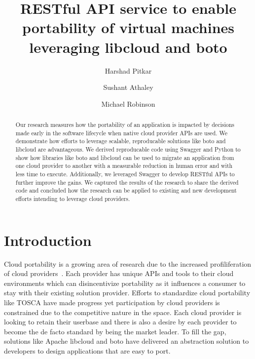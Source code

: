 % 
\title{RESTful API service to enable portability of virtual machines leveraging
libcloud and boto}


\author{Harshad Pitkar}

\author{Sushant Athaley}

\author{Michael Robinson}


\renewcommand{\shortauthors}{H. Pitkar, S. Athaley, M. Robinson}


\begin{abstract}
Our research measures how the portability of an application is impacted by
decisions made early in the software lifecycle when native cloud provider APIs
are used. We demonstrate how efforts to leverage scalable, reproducable
solutions like boto and libcloud are advantageous. We derived reproducable code
using Swagger and Python to show how libraries like boto and libcloud can be 
used to migrate an application from one cloud provider to another with a
measurable reduction in human error and with less  time to execute.
Additionally, we leveraged Swagger to develop RESTful APIs to  further improve
the gains. We captured the results of the research to share the derived code and
concluded how the research can be applied to existing and new development
efforts intending to leverage cloud providers. 
\end{abstract}


\maketitle

\section{Introduction}\label{introduction}

Cloud portability is a growing area of research due to the increased
profiliferation of cloud providers~\cite{hid-sp18-518-Cloud-Council}. Each
provider has unique APIs and tools to their cloud environments  which can
disincentivize portability as it influences a consumer to stay with their
existing solution provider. Efforts to standardize cloud portability like TOSCA
have made progress yet participation by cloud providers is constrained due to
the competitive nature in the space. Each cloud provider is looking to retain
their userbase and there is also a desire by each provider to become the de
facto standard by being the market leader. To fill the gap, solutions like
Apache libcloud and boto have delivered an abstraction solution to developers to
design applications that are easy to port.

